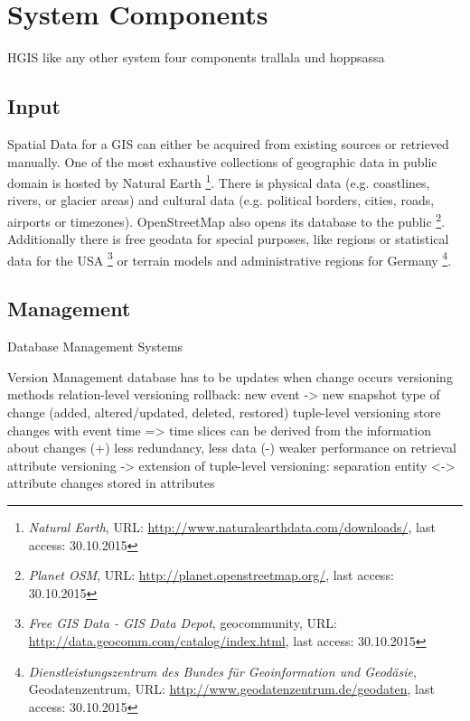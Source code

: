 
\section{System Components} %
\label{sec:system_components}

HGIS like any other system four components
trallala und hoppsassa

\subsection{Input} %
\label{sub:input}

Spatial Data for a GIS can either be acquired from existing sources or retrieved manually. One of the most exhaustive collections of geographic data in public domain is hosted by Natural Earth
\footnote{
  \textit{Natural Earth},
  URL: \url{http://www.naturalearthdata.com/downloads/},
  last access: 30.10.2015
}.
There is physical data (e.g. coastlines, rivers, or glacier areas) and cultural data (e.g. political borders, cities, roads, airports or timezones). OpenStreetMap also opens its database to the public
\footnote{
  \textit{Planet OSM},
  URL: \url{http://planet.openstreetmap.org/},
  last access: 30.10.2015
}.
Additionally there is free geodata for special purposes, like regions or statistical data for the USA
\footnote{
  \textit{Free GIS Data - GIS Data Depot},
  geocommunity,
  URL: \url{http://data.geocomm.com/catalog/index.html},
  last access: 30.10.2015
}
or terrain models and administrative regions for Germany
\footnote{
  \textit{Dienstleistungszentrum des Bundes für Geoinformation und Geodäsie},
  Geodatenzentrum,
  URL: \url{http://www.geodatenzentrum.de/geodaten},
  last access: 30.10.2015
}.


\subsection{Management} %
\label{sub:management}

Database Management Systems

Version Management
  database has to be updates when change occurs
  versioning methods
    relation-level versioning
      rollback: new event -> new snapshot
      type of change (added, altered/updated, deleted, restored)
    tuple-level versioning
      store changes with event time
      => time slices can be derived from the information about changes
      (+) less redundancy, less data
      (-) weaker performance on retrieval
    attribute versioning
      -> extension of tuple-level versioning: separation entity <-> attribute
      changes stored in attributes


